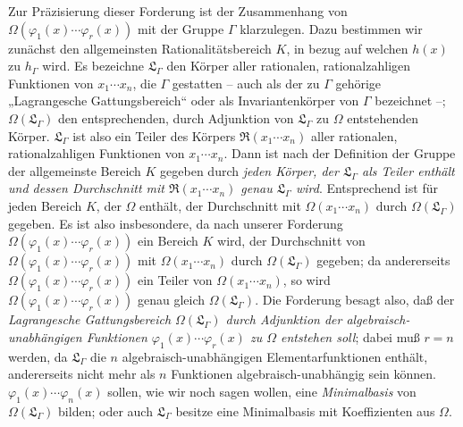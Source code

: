 \documentclass[11pt]{article}
\begin{document}
Zur Präzisierung dieser Forderung ist der Zusammenhang von $\Omega(\varphi_1(x)\cdots\varphi_r(x))$ mit der Gruppe $\Gamma$ klarzulegen. Dazu bestimmen wir zunächst den allgemeinsten Rationalitätsbereich $K$, in bezug auf welchen $h(x)$ zu $h_\Gamma$ wird. Es bezeichne $\mathfrak L_\Gamma$ den Körper aller rationalen, rationalzahligen Funktionen von $x_1\cdots x_n$, die $\Gamma$ gestatten -- auch als der zu $\Gamma$ gehörige „Lagrangesche Gattungsbereich“ oder als Invariantenkörper von $\Gamma$ bezeichnet --; $\Omega(\mathfrak L_\Gamma)$ den entsprechenden, durch Adjunktion von $\mathfrak L_\Gamma$ zu $\Omega$ entstehenden Körper. $\mathfrak L_\Gamma$ ist also ein Teiler des Körpers $\mathfrak R(x_1\cdots x_n)$ aller rationalen, rationalzahligen Funktionen von $x_1\cdots x_n$. Dann ist nach der Definition der Gruppe der allgemeinste Bereich $K$ gegeben durch \emph{jeden Körper, der $\mathfrak L_\Gamma$ als Teiler enthält und dessen Durchschnitt mit $\mathfrak R(x_1\cdots x_n)$ genau $\mathfrak L_\Gamma$ wird}. Entsprechend ist für jeden Bereich $K$, der $\Omega$ enthält, der Durchschnitt mit $\Omega(x_1\cdots x_n)$ durch $\Omega(\mathfrak L_\Gamma)$ gegeben. Es ist also insbesondere, da nach unserer Forderung $\Omega(\varphi_1(x)\cdots\varphi_r(x))$ ein Bereich $K$ wird, der Durchschnitt von $\Omega(\varphi_1(x)\cdots\varphi_r(x))$ mit $\Omega(x_1\cdots x_n)$ durch $\Omega(\mathfrak L_\Gamma)$ gegeben; da andererseits $\Omega(\varphi_1(x)\cdots\varphi_r(x))$ ein Teiler von $\Omega(x_1\cdots x_n)$, so wird $\Omega(\varphi_1(x)\cdots\varphi_r(x))$ genau gleich $\Omega(\mathfrak L_\Gamma)$. Die Forderung besagt also, daß der \emph{Lagrangesche Gattungsbereich $\Omega(\mathfrak L_\Gamma)$ durch Adjunktion der algebraisch-unabhängigen Funktionen $\varphi_1(x)\cdots\varphi_r(x)$ zu $\Omega$ entstehen soll}; dabei muß $r=n$ werden, da $\mathfrak L_\Gamma$ die $n$ algebraisch-unabhängigen Elementarfunktionen enthält, andererseits nicht mehr als $n$ Funktionen algebraisch-unabhängig sein können. $\varphi_1(x)\cdots\varphi_n(x)$ sollen, wie wir noch sagen wollen, eine \emph{Minimalbasis} von $\Omega(\mathfrak L_\Gamma)$ bilden; oder auch $\mathfrak L_\Gamma$ besitze eine Minimalbasis mit Koeffizienten aus $\Omega$.
\end{document}
